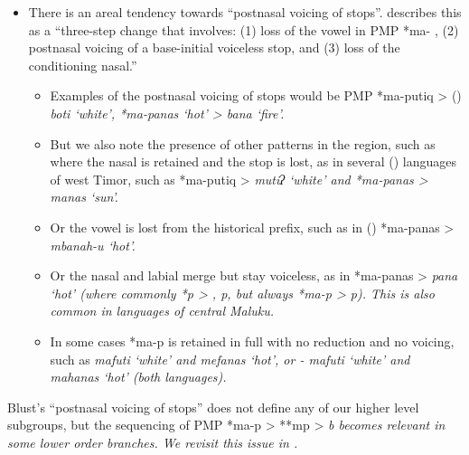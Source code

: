 \begin{itemize}
		\item There is an areal tendency towards “postnasal voicing of stops”.
					\citet[72]{Blust2009} describes this as a “three-step change that involves:
					(1) loss of the vowel in PMP *ma- ,
					(2) postnasal voicing of a base-initial voiceless stop,
					and (3) loss of the conditioning nasal.” 
	\begin{itemize}
			\item Examples of the postnasal voicing of stops
						would be PMP *ma-putiq >  () \it{boti} ‘white’,
						*ma-panas ‘hot’ >  \it{bana} ‘fire’.
			\item But we also note the presence of
						other patterns in the region,
						such as where the nasal is retained
						and the stop is lost, as in several 
						() languages of west Timor,
						such as *ma-putiq > \it{mutiʔ} ‘white’
						and *ma-panas > \it{manas} ‘sun’.
			\item Or the vowel is lost from the historical prefix,
						such as in  () *ma-panas > \it{mbanah-u} ‘hot’.
			\item Or the nasal and labial merge but stay voiceless,
						as in  *ma-panas > \it{pana} ‘hot’
						(where commonly *p > {\0}, \it{p},
						but always *ma-p > \it{p}).
						This is also common in 
						languages of central Maluku.
			\item In some cases *ma-p is retained in full
						with no reduction and no voicing,
						such as  \it{mafuti} ‘white’
						and \it{mefanas} ‘hot’, or - \it{mafuti} ‘white’
						and \it{mahanas} ‘hot’
						(both  languages).
	\end{itemize}
\end{itemize}

Blust’s “postnasal voicing of stops” does
not define any of our higher level subgroups,
but the sequencing of PMP *ma-p > **mp > \it{b}
becomes relevant in some lower order branches.
We revisit this issue in .

